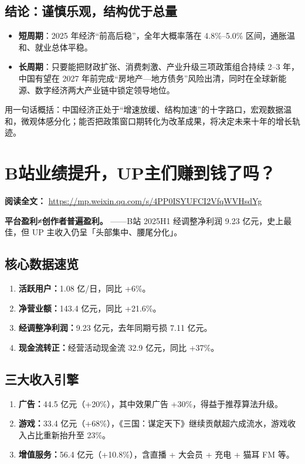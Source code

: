 \subsection{结论：谨慎乐观，结构优于总量}
\begin{itemize}
  \item \textbf{短周期}：2025 年经济“前高后稳”，全年大概率落在 4.8\%–5.0\% 区间，通胀温和、就业总体平稳。
  \item \textbf{长周期}：只要能把财政扩张、消费刺激、产业升级三项政策组合持续 2–3 年，中国有望在 2027 年前完成“房地产—地方债务”风险出清，同时在全球新能源、数字经济两大产业链中锁定领导地位。
\end{itemize}

用一句话概括：中国经济正处于“增速放缓、结构加速”的十字路口，宏观数据温和，微观体感分化；能否把政策窗口期转化为改革成果，将决定未来十年的增长轨迹。



\section{B站业绩提升，UP主们赚到钱了吗？}
\vspace{1em}
\noindent\textbf{阅读全文：} \url{https://mp.weixin.qq.com/s/4PP0ISYUFCI2VfqWVHsdYg}

\textbf{平台盈利≠创作者普遍盈利。}
——B站 2025H1 经调整净利润 9.23 亿元，史上最佳，但 UP 主收入仍呈「头部集中、腰尾分化」。

\subsection{核心数据速览}
\begin{enumerate}[leftmargin=*, nosep]
    \item \textbf{活跃用户：}1.08 亿/日，同比 +6\%。
    \item \textbf{净营业额：}143.4 亿元，同比 +21.6\%。
    \item \textbf{经调整净利润：}9.23 亿元，去年同期亏损 7.11 亿元。
    \item \textbf{现金流转正：}经营活动现金流 32.9 亿元，同比 +37\%。
\end{enumerate}

\subsection{三大收入引擎}
\begin{enumerate}[leftmargin=*, nosep]
    \item \textbf{广告：}44.5 亿元（+20\%），其中效果广告 +30\%，得益于推荐算法升级。
    \item \textbf{游戏：}33.4 亿元（+68\%），《三国：谋定天下》继续贡献超六成流水，游戏收入占比重新抬升至 23\%。
    \item \textbf{增值服务：}56.4 亿元（+10.8\%），含直播 + 大会员 + 充电 + 猫耳 FM 等。
\end{enumerate}

